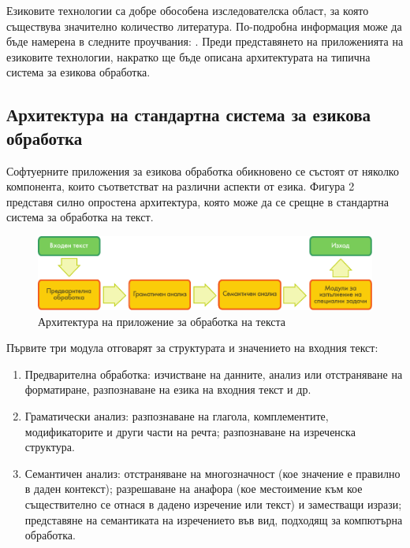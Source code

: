 \begin{multicols}{2}
  Езиковите технологии са добре обособена изследователска област, за която съществува значително количество литература. По-подробна информация може да бъде намерена в следните проучвания:  \cite{jurafsky-martin01, manning-schuetze1, lt-world1, lt-survey1}.
  Преди представянето на приложенията на езиковите технологии, накратко ще бъде описана  архитектурата на типична система за езикова обработка.

  \subsection{Архитектура на стандартна система за езикова обработка}

  Софтуерните приложения за езикова обработка обикновено се състоят от няколко компонента, които съответстват на различни аспекти от езика. Фигура 2 представя силно опростена архитектура, която може да се срещне в стандартна система за обработка на текст. 

  \begin{figure}[b]
    \center
    \includegraphics[width=\textwidth]{../_media/bulgarian/text_processing_app_architecture}
    \caption{Архитектура на приложение за обработка на текста}
    \label{fig:textprocessingarch_de}
  \end{figure}

  Първите три модула отговарят за структурата и значението на входния
  текст:

  \begin{enumerate}
  \item Предварителна обработка: изчистване на данните, анализ или отстраняване на форматиране, разпознаване на езика на входния текст и др. 
  \item Граматически анализ: разпознаване на глагола, комплементите, модификаторите и други части на речта; разпознаване на изреченска структура. 
  \item Семантичен анализ: отстраняване на многозначност (кое значение е правилно в даден контекст); разрешаване на анафора (кое местоимение към кое съществително се отнася в дадено изречение или текст) и заместващи изрази; представяне на семантиката на изречението във вид, подходящ за компютърна обработка. 
  \end{enumerate}


\end{multicols}
